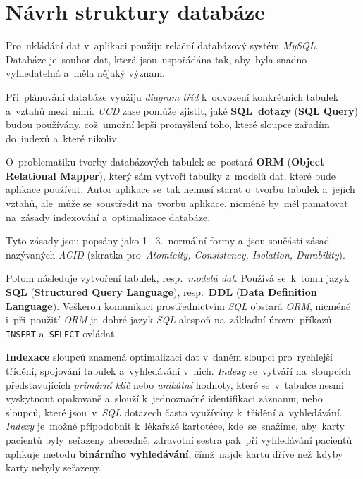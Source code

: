 \documentclass[11pt,a4paper]{report}
\begin{document}
        \section{Návrh struktury databáze}
            Pro~ukládání dat v~aplikaci použiju relační databázový systém \emph{MySQL}. Databáze je~soubor dat, která jsou~uspořádána tak, aby~byla snadno vyhledatelná a~měla nějaký význam.

            Při~plánování databáze využiju \emph{diagram tříd} k~odvození konkrétních tabulek a~vztahů mezi~nimi. \emph{UCD} zase pomůže zjistit, jaké \textbf{SQL~dotazy} (\textbf{SQL Query}) budou používány, což~umožní lepší promyšlení toho, které sloupce zařadím do~indexů a~které nikoliv.

            O~problematiku tvorby databázových tabulek se~postará \textbf{ORM} (\textbf{Object Relational Mapper}), který sám vytvoří tabulky z~modelů dat, které bude aplikace používat. Autor aplikace se~tak nemusí starat o~tvorbu tabulek a~jejich vztahů, ale~může se~soustředit na~tvorbu aplikace, nicméně by~měl pamatovat na~zásady indexování a~optimalizace databáze.
            
            Tyto zásady jsou popsány jako 1\,--\,3.~normální formy a~jsou součástí zásad nazývaných \emph{ACID} (zkratka pro~\emph{Atomicity, Consistency, Isolation, Durability}). \cite{interval:normalniformydb, bmcACIDExplained}

            Potom následuje vytvoření tabulek, resp.~\emph{modelů dat}. Používá se~k~tomu jazyk \textbf{SQL} (\textbf{Structured Query Language}), resp.~\textbf{DDL} (\textbf{Data Definition Language}). Veškerou komunikaci prostřednictvím \emph{SQL} obstará \emph{ORM}, nicméně i~při~použití \emph{ORM} je~dobré jazyk \emph{SQL} alespoň na~základní úrovni příkazů \texttt{INSERT} a~\texttt{SELECT} ovládat.

            \textbf{Indexace} sloupců znamená optimalizaci dat v~daném sloupci pro~rychlejší třídění, spojování tabulek a~vyhledávání v~nich. \emph{Indexy} se~vytváří na~sloupcích představujících \emph{primární klíč} nebo \emph{unikátní} hodnoty, které se~v~tabulce nesmí vyskytnout opakovaně a~slouží k~jednoznačné identifikaci záznamu, nebo sloupců, které jsou~v~\emph{SQL} dotazech často využívány k~třídění a~vyhledávání. \emph{Indexy} je~možné připodobnit k~lékařské kartotéce, kde~se~snažíme, aby~karty pacientů byly~seřazeny abecedně, zdravotní sestra pak~při vyhledávání pacientů aplikuje metodu \textbf{binárního vyhledávání}, čímž~najde kartu dříve než~kdyby karty nebyly seřazeny. \cite{interval:normalniformydb, laurencik2018sql}
\end{document}
